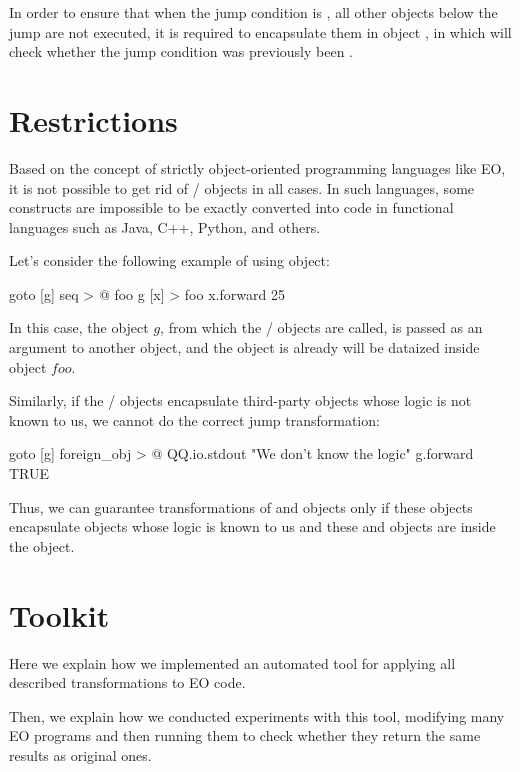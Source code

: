\documentclass[sigplan,review,11pt,nonacm,natbib=false]{acmart}
\theoremstyle{theorems}
\begin{document}
In order to ensure that when the jump condition is , all other objects below the jump are not executed, it is required to encapsulate them in object , in which will check whether the jump condition was previously been .


\section{Restrictions}
Based on the concept of strictly object-oriented programming languages like EO, it is not possible to get rid of / objects in all cases.
In such languages, some constructs are impossible to be exactly converted into code in functional languages such as Java, C++, Python, and others.

Let's consider the following example of using  object:
\begin{ffcode}
goto
  [g]
    seq > @
      foo g
[x] > foo
  x.forward 25
\end{ffcode}
In this case, the object $g$, from which the / objects are called, is passed as an argument to another object, and the  object is already will be dataized inside object $foo$.

Similarly, if the / objects encapsulate third-party objects whose logic is not known to us, we cannot do the correct jump transformation:
\begin{ffcode}
goto
  [g]
    foreign_obj > @
      QQ.io.stdout
        "We don't know the logic\n"
      g.forward TRUE
\end{ffcode}

Thus, we can guarantee transformations of  and  objects only if these objects encapsulate objects whose logic is known to us and these  and  objects are inside the  object.


\section{Toolkit}

Here we explain how we implemented an automated tool for applying all described transformations to EO code.

Then, we explain how we conducted experiments with this tool, modifying many EO programs and then running them to check whether they return the same results as original ones.
\end{document}
